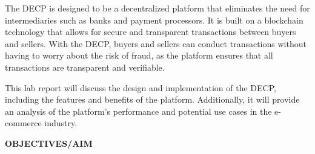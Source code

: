 \documentclass[a4paper,11pt]{article}
\begin{document}
\begin{center}
\begin{center}
The DECP is designed to be a decentralized platform that eliminates the need for intermediaries such as banks and payment processors. It is built on a blockchain technology that allows for secure and transparent transactions between buyers and sellers. With the DECP, buyers and sellers can conduct transactions without having to worry about the risk of fraud, as the platform ensures that all transactions are transparent and verifiable.

This lab report will discuss the design and implementation of the DECP, including the features and benefits of the platform. Additionally, it will provide an analysis of the platform's performance and potential use cases in the e-commerce industry.
\end{center}





    

\vspace{1cm}

\begin{center}
 \textbf{\Large OBJECTIVES/AIM}   



\end{center}
\end{center}
\end{document}
